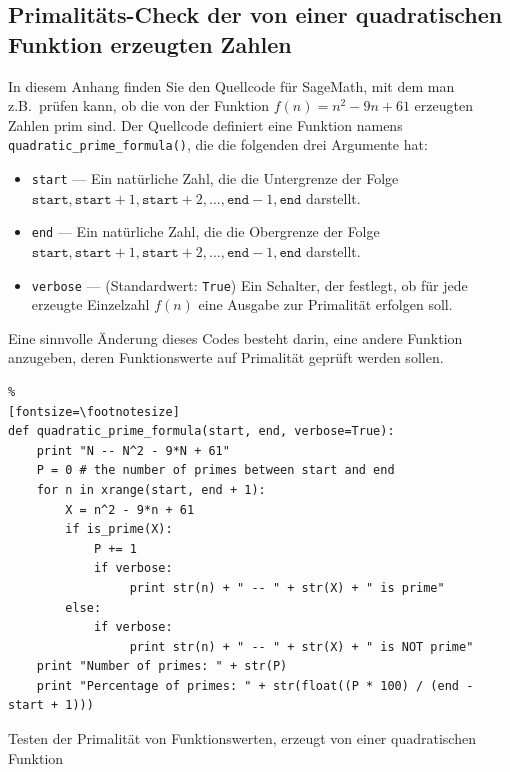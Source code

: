 \begin{refsegment}
\subsection{Primalitäts-Check der von einer quadratischen Funktion erzeugten Zahlen}

In diesem Anhang finden Sie den Quellcode für SageMath, mit dem man
z.B.\ prüfen kann, ob die von der Funktion $f(n) = n^2 - 9n + 61$
erzeugten Zahlen prim sind.
Der Quellcode definiert eine Funktion namens \verb!quadratic_prime_formula()!,
die die folgenden drei Argumente hat:
\begin{itemize}
\item \verb!start! --- Ein natürliche Zahl, die die Untergrenze der Folge
  $\texttt{start}, \texttt{start} + 1,
  \texttt{start} + 2, \dots, \texttt{end} - 1, \texttt{end}$ darstellt.

\item \verb!end! --- Ein natürliche Zahl, die die Obergrenze der Folge
  $\texttt{start}, \texttt{start} + 1,
  \texttt{start} + 2, \dots, \texttt{end} - 1, \texttt{end}$ darstellt.

\item \verb!verbose! --- (Standardwert: \verb!True!) Ein Schalter, der festlegt,
  ob für jede erzeugte Einzelzahl $f(n)$ eine Ausgabe zur Primalität erfolgen soll.
\end{itemize}

 Eine sinnvolle Änderung dieses Codes besteht darin, eine andere Funktion anzugeben,
deren Funktionswerte auf Primalität geprüft werden sollen.


\begin{sagecode}
\begin{Verbatim}%
[fontsize=\footnotesize]
def quadratic_prime_formula(start, end, verbose=True):
    print "N -- N^2 - 9*N + 61"
    P = 0 # the number of primes between start and end
    for n in xrange(start, end + 1):
        X = n^2 - 9*n + 61
        if is_prime(X):
            P += 1
            if verbose:
                 print str(n) + " -- " + str(X) + " is prime"
        else:
            if verbose:
                 print str(n) + " -- " + str(X) + " is NOT prime"
    print "Number of primes: " + str(P)
    print "Percentage of primes: " + str(float((P * 100) / (end - start + 1)))
\end{Verbatim}
\caption{Testen der Primalität von Funktionswerten, erzeugt von einer quadratischen Funktion}
\end{sagecode}


\end{refsegment}

